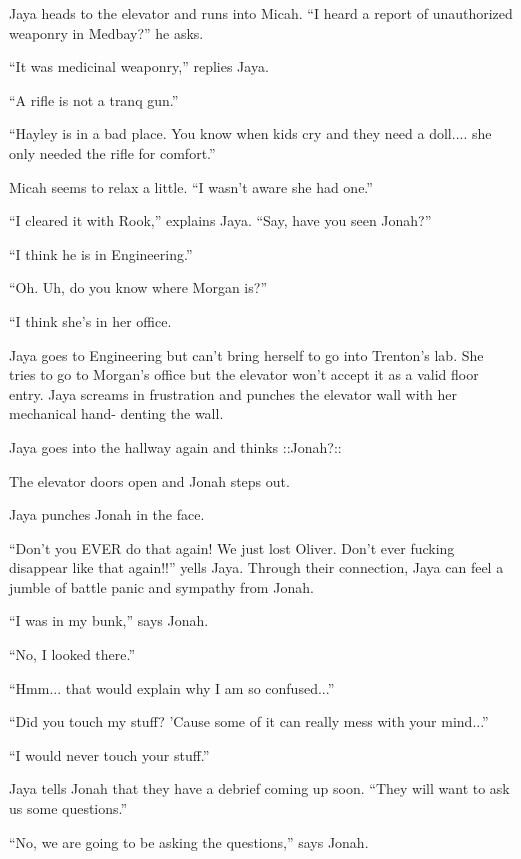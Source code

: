 Jaya heads to the elevator and runs into Micah.  ``I heard a report of unauthorized weaponry in Medbay?'' he asks.

``It was medicinal weaponry,'' replies Jaya.

``A rifle is not a tranq gun.''

``Hayley is in a bad place.  You know when kids cry and they need a doll.... she only needed the rifle for comfort.''

Micah seems to relax a little. ``I wasn't aware she had one.''

``I cleared it with Rook,'' explains Jaya.  ``Say, have you seen Jonah?''

``I think he is in Engineering.''

``Oh.  Uh, do you know where Morgan is?''

``I think she's in her office.



Jaya goes to Engineering but can't bring herself to go into Trenton's lab.  She tries to go to Morgan's office but the elevator won't accept it as a valid floor entry.  Jaya screams in frustration and punches the elevator wall with her mechanical hand- denting the wall.





Jaya goes into the hallway again and thinks  {\color[RGB]{255,0,0}::Jonah?::} 

The elevator doors open and Jonah steps out.

Jaya punches Jonah in the face.

``Don't you EVER do that again!  We just lost Oliver.  Don't ever fucking disappear like that again!!'' yells Jaya.  Through their connection, Jaya can feel a jumble of battle panic and sympathy from Jonah.

``I was in my bunk,'' says Jonah.

``No, I looked there.''

``Hmm... that would explain why I am so confused...''

``Did you touch my stuff?  'Cause some of it can really mess with your mind...''

``I would never touch your stuff.''



Jaya tells Jonah that they have a debrief coming up soon.  ``They will want to ask us some questions.''

``No, we are going to be asking the questions,'' says Jonah.


